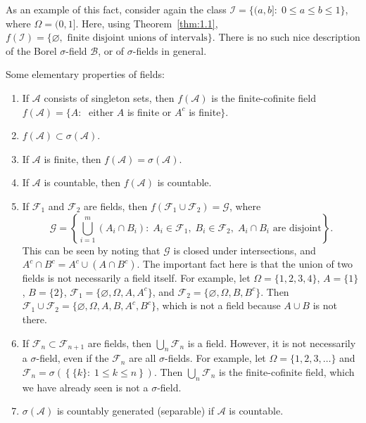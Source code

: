 \documentclass[11pt,fleqn]{book} %
\begin{document}
As an example of this fact, consider again the class $\mathcal{I} = \{(a,b]:\;0 \leq a \leq b \leq 1\}$, where $\Omega = (0,1]$. Here, using Theorem~\ref{thm:1.1}, $f(\mathcal{I}) = \{\varnothing, \textrm{ finite disjoint unions of intervals}\}$. There is no such nice description of the Borel $\sigma$-field $\mathcal{B}$, or of $\sigma$-fields in general.

\vspace{10pt}

Some elementary properties of fields:

\begin{enumerate}
	\item If $\mathcal{A}$ consists of singleton sets, then $f(\mathcal{A})$ is the finite-cofinite field $f(\mathcal{A}) = \{A:\;$ either $A$ is finite or $A^c$ is finite$\}$.
	\item $f(\mathcal{A}) \subset \sigma(\mathcal{A})$.
	\item If $\mathcal{A}$ is finite, then $f(\mathcal{A}) = \sigma(\mathcal{A})$.
	\item If $\mathcal{A}$ is countable, then $f(\mathcal{A})$ is countable.
	\item If $\mathcal{F}_1$ and $\mathcal{F}_2$ are fields, then $f(\mathcal{F}_1 \cup \mathcal{F}_2) = \mathcal{G}$, where
	\[
		\mathcal{G} = \left\{ \bigcup_{i=1}^m \left( A_i \cap B_i \right):\;A_i \in \mathcal{F}_1,\;B_i \in \mathcal{F}_2,\;A_i \cap B_i \textrm{ are disjoint} \right\}.
	\]
	This can be seen by noting that $\mathcal{G}$ is closed under intersections, and $A^c \cap B^c = A^c \cup (A \cap B^c)$. The important fact here is that the union of two fields is not necessarily a field itself. For example, let $\Omega = \{1,2,3,4\}$, $A = \{1\}$, $B = \{2\}$, $\mathcal{F}_1 = \{\varnothing, \Omega, A, A^c\}$, and $\mathcal{F}_2 = \{\varnothing, \Omega, B, B^c\}$. Then $\mathcal{F}_1 \cup \mathcal{F}_2 = \{\varnothing, \Omega, A, B, A^c, B^c\}$, which is not a field because $A \cup B$ is not there.
	\item If $\mathcal{F}_n \subset \mathcal{F}_{n+1}$ are fields, then $\bigcup_n \mathcal{F}_n$ is a field. However, it is not necessarily a $\sigma$-field, even if the $\mathcal{F}_n$ are all $\sigma$-fields. For example, let $\Omega = \{1,2,3,\dots\}$ and $\mathcal{F}_n = \sigma(\left\{\{k\}:\;1 \leq k \leq n \right\})$. Then $\bigcup_n \mathcal{F}_n$ is the finite-cofinite field, which we have already seen is not a $\sigma$-field.
	\item $\sigma(\mathcal{A})$ is countably generated (separable) if $\mathcal{A}$ is countable.

\end{enumerate}
\end{document}
